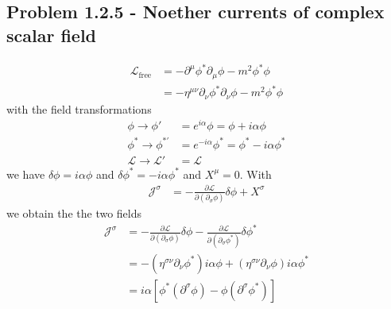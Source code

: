 \documentclass[10pt,a4paper]{book}
\theoremstyle{definition}
\begin{document}
\subsection{Problem 1.2.5 - Noether currents of complex scalar field}
\begin{align}
    \mathcal{L}_\text{free}&=-\partial^\mu\phi^*\partial_\mu\phi-m^2\phi^*\phi\\
    &=-\eta^{\mu\nu}\partial_\nu\phi^*\partial_\nu\phi-m^2\phi^*\phi
\end{align}
with the field transformations
\begin{align}
    \phi\rightarrow\phi'&=e^{i\alpha}\phi=\phi+i\alpha\phi\\
    \phi^*\rightarrow\phi^{*'}&=e^{-i\alpha}\phi^*=\phi^*-i\alpha\phi^*\\
    \mathcal{L}\rightarrow\mathcal{L}'&=\mathcal{L}
\end{align}
we have $\delta\phi=i\alpha\phi$ and $\delta\phi^*=-i\alpha\phi^*$ and $X^\mu=0$. With 
\begin{align}
    \mathcal{J}^\sigma&=-\frac{\partial\mathcal{L}}{\partial(\partial_\sigma\phi)}\delta\phi+X^\sigma
\end{align}
we obtain the the two fields
\begin{align}    
    \mathcal{J}^\sigma&=-\frac{\partial\mathcal{L}}{\partial(\partial_\sigma\phi)}\delta\phi-\frac{\partial\mathcal{L}}{\partial(\partial_\sigma\phi^*)}\delta\phi^*\\
    &=-(\eta^{\sigma\nu}\partial_\nu\phi^*)i\alpha\phi+(\eta^{\sigma\nu}\partial_\nu\phi)i\alpha\phi^*\\
    &=i\alpha\left[\phi^*(\partial^\sigma\phi)-\phi(\partial^\sigma\phi^*)\right]
\end{align}
\end{document}
